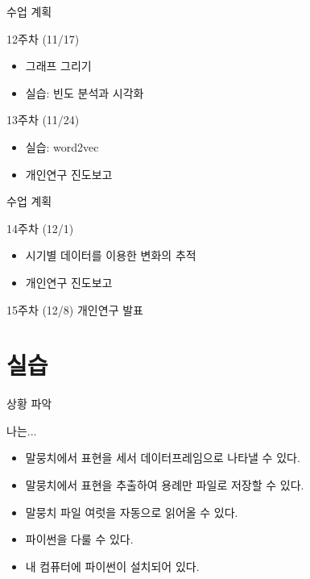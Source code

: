\documentclass[11pt, aspectratio=169]{beamer}
\begin{document}
\begin{frame}[t]{수업 계획}
  \begin{block}{12주차 (11/17)}
    \begin{itemize}
      \item 그래프 그리기
      \item 실습: 빈도 분석과 시각화
    \end{itemize}    
  \end{block}

  \begin{block}{13주차 (11/24)}
    \begin{itemize}
      \item 실습: word2vec
      \item 개인연구 진도보고
    \end{itemize}    
  \end{block}

\end{frame}

\begin{frame}[t]{수업 계획}
  \begin{block}{14주차 (12/1)}
    \begin{itemize}
      \item 시기별 데이터를 이용한 변화의 추적
      \item 개인연구 진도보고
    \end{itemize}    
  \end{block}

  \begin{block}{15주차 (12/8)}
    개인연구 발표
  \end{block}
\end{frame}

\section{실습}

\begin{frame}[t]{상황 파악}
  \begin{block}{나는...}
    \begin{itemize}
      \item 말뭉치에서 표현을 세서 데이터프레임으로 나타낼 수 있다.
      \item 말뭉치에서 표현을 추출하여 용례만 파일로 저장할 수 있다.
      \item 말뭉치 파일 여럿을 자동으로 읽어올 수 있다.
      \item 파이썬을 다룰 수 있다.
      \item 내 컴퓨터에 파이썬이 설치되어 있다.
    \end{itemize}      
  \end{block}
\end{frame}
\end{document}
